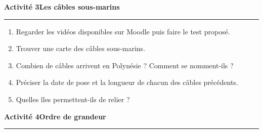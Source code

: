 \documentclass[a4paper]{article}
\begin{document}
\noindent\textbf{Activité 3}\hfill{}\textbf{Les câbles sous-marins}
\smallskip
\hrule
\medskip

\begin{enumerate}
  \item Regarder les vidéos disponibles sur Moodle puis faire le test proposé.
  \item Trouver une carte des câbles sous-marins.
  \item Combien de câbles arrivent en Polynésie ? Comment se nomment-ils ?
  \item Préciser la date de pose et la longueur de chacun des câbles précédents.
  \item Quelles îles permettent-ils de relier ?
\end{enumerate}

\bigskip


\noindent\textbf{Activité 4}\hfill{}\textbf{Ordre de grandeur}
\smallskip
\hrule
\medskip
\end{document}
